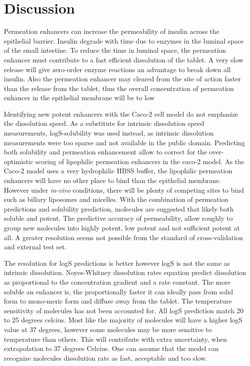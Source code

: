 \section{Discussion}

Permeation enhancers can increase the permeability of insulin across the epithelial barrier. Insulin degrade with time due to enzymes in the luminal space of the small intestine. To reduce the time in luminal space, the permeation enhancer must contribute to a fast efficient dissolution of the tablet. A very slow release will give zero-order enzyme reactions an advantage to break down all insulin. Also the permeation enhancer may cleared from the site of action faster than the release from the tablet, thus the overall concentration of permeation enhancer in the epithelial membrane will be to low

Identifying new potent enhancers with the Caco-2 cell model do not emphasize the dissolution speed. As a substitute for intrinsic dissolution speed measurements, logS-solubility was used instead, as intrinsic dissolution measurements were too sparse and not available in the public domain. Predicting both solubility and permeation enhancement allow to correct for the over-optimistic scoring of lipophilic permeation enhancers in the caco-2 model. As the Caco-2 model uses a very hydrophilic HBSS buffer, the lipophilic permeation enhancers will have no other place to bind than the epithelial membrane. However under \textit{in-vivo} conditions, there will be plenty of competing sites to bind such as billary liposomes and micelles. With the combination of permeation predictions and solubility prediction, molecules are suggested that likely both soluble and potent. The predictive accuracy of permeability, allow roughly to group new molecules into highly potent, low potent and not sufficient potent at all. A greater resolution seems not possible from the standard of cross-validation and external test set.

The resolution for logS predictions is better however logS is not the same as intrinsic dissolution. Noyes-Whitney dissolution rates equation predict dissolution as proportional to the concentration gradient and a rate constant. The more soluble an enhancer is, the proportionally faster it can ideally pass from solid form to mono-meric form and diffuse away from the tablet. The temperature sensitivity of molecules has not been accounted for. All logS prediction match 20 to 25 degrees celcius. Most like the majority of molecules will have a higher logS value at 37 degrees, however some molecules may be more sensitive to temperature than others. This will contribute with extra uncertainty, when extrapolation to 37 degrees Celcius. One can assume that the model can recognize molecules dissolution rate as fast, acceptable and too slow.

